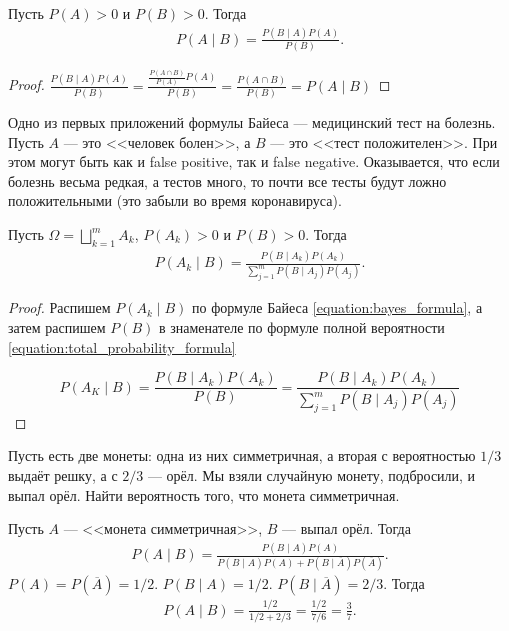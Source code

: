 \documentclass[../main.tex]{subfiles}
\begin{document}
\begin{prop}
 Пусть $P(A) > 0$ и  $P(B) > 0$. Тогда
 \begin{align}
  \label{equation:bayes_formula}
  P(A \mid B) = \frac{P(B \mid A)P(A)}{P(B)}.
 \end{align} 
\end{prop}
\begin{proof} $\frac{P(B \mid A)P(A)}{P(B)} = \frac{\frac{P(A \cap B)}{P(A)}P(A)}{P(B)} = \frac{P(A \cap B)}{P(B)} = P(A \mid B)$
\end{proof}
\begin{exmpl*}
 Одно из первых приложений формулы Байеса --- медицинский тест на болезнь. Пусть $A$ --- это <<человек болен>>, а $B$ --- это <<тест положителен>>. При этом могут быть как и false positive, так и false negative. Оказывается, что если болезнь весьма редкая, а тестов много, то почти все тесты будут ложно положительными (это забыли во время коронавируса).
\end{exmpl*}

\begin{thm}[Байеса]
 Пусть $\Omega = \bigsqcup_{k=1}^{m} A_k$, $P(A_k) > 0$ и $P(B) > 0$. Тогда
 \begin{align*}
  P(A_k \mid B) = \frac{P(B \mid A_k)P(A_k)}{\sum_{j=1}^{m} P(B \mid A_j)P(A_j)}
 .\end{align*} 
\end{thm}

\begin{proof}
	Распишем $P(A_k \mid B)$ по формуле Байеса \eqref{equation:bayes_formula}, а затем распишем $P(B)$ в знаменателе по формуле полной вероятности \eqref{equation:total_probability_formula}

	\[
		P(A_K \mid B) = \frac{P(B \mid A_k)P(A_k)}{P(B)} = \frac{P(B \mid A_k)P(A_k)}{\sum_{j = 1}^m P(B \mid A_j)P(A_j)}
	\]  

\end{proof}

\begin{exmpl*}
 Пусть есть две монеты: одна из них симметричная, а вторая с вероятностью $1 / 3$ выдаёт решку, а с $2 / 3$ --- орёл. Мы взяли случайную монету, подбросили, и выпал орёл. Найти вероятность того, что монета симметричная.

 Пусть $A$ --- <<монета симметричная>>, $B$ --- выпал орёл. Тогда
 \begin{align*}
  P(A \mid B) = \frac{P(B\mid A)P(A)}{P(B \mid A)P(A) + P(B \mid \overline A) P(\overline A)}
 .\end{align*} $P(A) = P(\overline A) = 1 / 2$.  $P(B \mid A) = 1 / 2$.  $P(B \mid \overline A) = 2 / 3$. Тогда
 \begin{align*}
  P(A \mid B) = \frac{1 / 2}{1 / 2 + 2 / 3} = \frac{1 / 2}{7 / 6} = \frac{3}{7}
 .\end{align*} 

\end{exmpl*}
\end{document}
